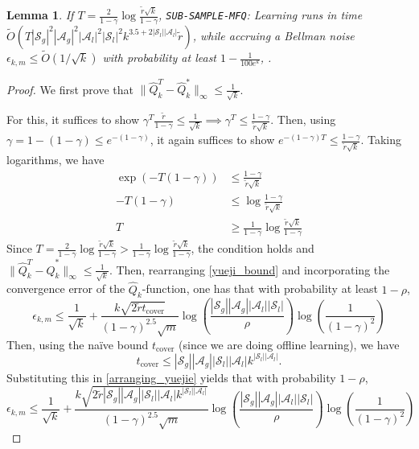 \documentclass{article}
\theoremstyle{plain}
\newtheorem{lemma}[theorem]{Lemma}
\theoremstyle{definition}
\begin{document}
\begin{lemma}\label{lemma: epsilon_km_is_k} If $T= \frac{2}{1-\gamma}\log \frac{\tilde{r}\sqrt{k}}{1-\gamma}$, \emph{\texttt{SUB-SAMPLE-MFQ}: Learning} runs in time $\tilde{O}(T|\mathcal{S}_g|^2|\mathcal{A}_g|^2|\mathcal{A}_l|^2|\mathcal{S}_l|^2 k^{3.5 + 2|\mathcal{S}_l||\mathcal{A}_l|}\tilde{r})$, while accruing a Bellman noise $\epsilon_{k,m}\leq \tilde{O}(1/\sqrt{k})$ with probability at least $1 - \frac{1}{100 e^k}$, .\end{lemma}
\begin{proof}
We first prove that $\|\hat{Q}_k^T - \hat{Q}_k^*\|_\infty \leq \frac{1}{\sqrt{k}}$. 

For this, it suffices to show $\gamma^T \frac{\tilde{r}}{1-\gamma} \leq \frac{1}{\sqrt{k}} \implies \gamma^T \leq \frac{1-\gamma}{\tilde{r}\sqrt{k}}$. Then, using $\gamma = 1 - (1 - \gamma) \leq e^{-(1-\gamma)}$, it again suffices to show $e^{-(1-\gamma)T}\leq \frac{1-\gamma}{\tilde{r}\sqrt{k}}$. Taking logarithms, we have
\begin{align*}
    \exp(-T(1-\gamma)) &\leq \frac{1-\gamma}{\tilde{r}\sqrt{k}} \\
    -T(1-\gamma) &\leq \log\frac{1-\gamma}{\tilde{r}\sqrt{k}} \\
    T&\geq \frac{1}{1-\gamma}\log\frac{\tilde{r}\sqrt{k}}{1-\gamma}
\end{align*}
Since $T = \frac{2}{1-\gamma}\log\frac{\tilde{r}\sqrt{k}}{1-\gamma} > \frac{1}{1-\gamma}\log\frac{\tilde{r}\sqrt{k}}{1-\gamma}$, the condition holds and $\|\hat{Q}_k^T - \hat{Q}_k^*\|_\infty \leq \frac{1}{\sqrt{k}}$. Then, rearranging \cref{yueji_bound} and incorporating the convergence error of the $\hat{Q}_k$-function, one has that with probability at least $1-\rho$,
\begin{equation}\label{arranging_yuejie}
        \epsilon_{k,m} \leq \frac{1}{\sqrt{k}} + \frac{k\sqrt{2\tilde{r} t_{\text{cover}}}}{(1-\gamma)^{2.5}\sqrt{m}}\log\left(\frac{|\mathcal{S}_g||\mathcal{A}_g||\mathcal{A}_l||\mathcal{S}_l|}{\rho}\right)\log\left(\frac{1}{(1-\gamma)^2}\right)
    \end{equation}
    Then, using the naïve bound $t_{\text{cover}}$ (since we are doing offline learning), we have \[t_{\text{cover}} \leq |\mathcal{S}_g||\mathcal{A}_g||\mathcal{S}_l||\mathcal{A}_l|k^{|\mathcal{S}_l||\mathcal{A}_l|}.\]
    Substituting this in \cref{arranging_yuejie} yields that with probability $1-\rho$,
    \begin{equation}
        \epsilon_{k,m} \leq \frac{1}{\sqrt{k}}+ \frac{k\sqrt{2\tilde{r} |\mathcal{S}_g||\mathcal{A}_g||\mathcal{S}_l||\mathcal{A}_l|k^{|\mathcal{S}_l||\mathcal{A}_l|}}}{(1-\gamma)^{2.5}\sqrt{m}}\log\left(\frac{|\mathcal{S}_g||\mathcal{A}_g||\mathcal{A}_l||\mathcal{S}_l|}{\rho}\right)\log\left(\frac{1}{(1-\gamma)^2}\right)

\end{equation}
\end{proof}
\end{document}
